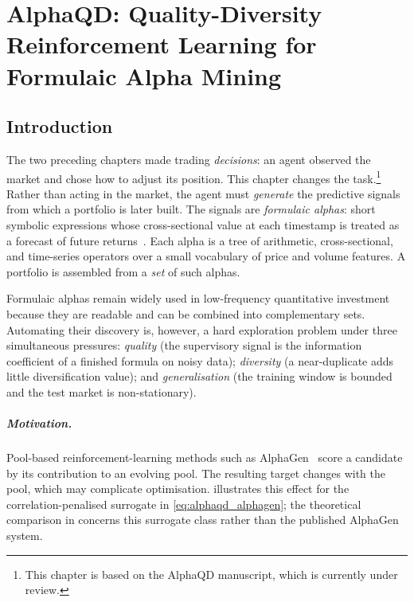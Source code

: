 
\chapter{AlphaQD: Quality-Diversity Reinforcement Learning for Formulaic Alpha Mining} %
\label{ch:alphaqd}

\section{Introduction}
\label{sec:alphaqd_intro}

The two preceding chapters made trading \emph{decisions}: an agent observed the market and chose how to adjust its position. This chapter changes the task.\footnote{This chapter is based on the AlphaQD manuscript, which is currently under review.} Rather than acting in the market, the agent must \emph{generate} the predictive signals from which a portfolio is later built. The signals are \emph{formulaic alphas}: short symbolic expressions whose cross-sectional value at each timestamp is treated as a forecast of future returns~\cite{kakushadze2016101}. Each alpha is a tree of arithmetic, cross-sectional, and time-series operators over a small vocabulary of price and volume features. A portfolio is assembled from a \emph{set} of such alphas.

Formulaic alphas remain widely used in low-frequency quantitative investment because they are readable and can be combined into complementary sets. Automating their discovery is, however, a hard exploration problem under three simultaneous pressures: \emph{quality} (the supervisory signal is the information coefficient of a finished formula on noisy data); \emph{diversity} (a near-duplicate adds little diversification value); and \emph{generalisation} (the training window is bounded and the test market is non-stationary).

\paragraph{Motivation.} Pool-based reinforcement-learning methods such as AlphaGen~\cite{yu2023alphagen} score a candidate by its contribution to an evolving pool. The resulting target changes with the pool, which may complicate optimisation.  illustrates this effect for the correlation-penalised surrogate in \eqref{eq:alphaqd_alphagen}; the theoretical comparison in  concerns this surrogate class rather than the published AlphaGen system.

